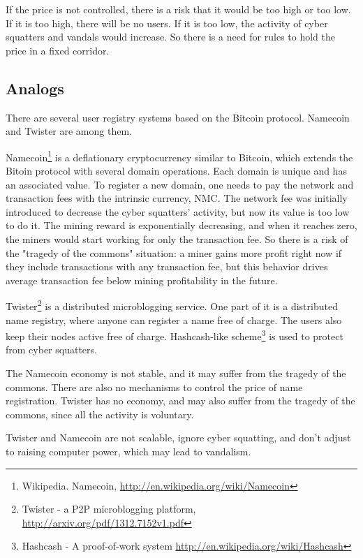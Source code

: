 \documentclass[12pt]{article}
\begin{document}
If the price is not controlled, there is a risk that it would be too high or too low. If it is too high, there will be no users. If it is too low, the activity of cyber squatters and vandals would increase. So there is a need for rules to hold the price in a fixed corridor.


\subsection{Analogs}

There are several user registry systems based on the Bitcoin protocol. Namecoin and Twister are among them.

Namecoin\footnote{Wikipedia. Namecoin, \href{http://en.wikipedia.org/wiki/Namecoin}{http://en.wikipedia.org/wiki/Namecoin}} is a deflationary cryptocurrency similar to Bitcoin, which extends the Bitoin protocol with several domain operations. Each domain is unique and has an associated value. To register a new domain, one needs to pay the network and transaction fees with the intrinsic currency, NMC. The network fee was initially introduced to decrease the cyber squatters' activity, but now its value is too low to do it. The mining reward is exponentially decreasing, and when it reaches zero, the miners would start working for only the transaction fee. So there is a risk of the "tragedy of the commons" situation: a miner gains more profit right now if they include transactions with any transaction fee, but this behavior drives average transaction fee below mining profitability in the future.

Twister\footnote{Twister - a P2P microblogging platform, \href{http://arxiv.org/pdf/1312.7152v1.pdf}{http://arxiv.org/pdf/1312.7152v1.pdf}} is a distributed microblogging service. One part of it is a distributed name registry, where anyone can register a name free of charge. The users also keep their nodes active free of charge. Hashcash-like scheme\footnote{Hashcash - A proof-of-work system \href{http://en.wikipedia.org/wiki/Hashcash}{http://en.wikipedia.org/wiki/Hashcash}} is used to protect from cyber squatters.

The Namecoin economy is not stable, and it may suffer from the tragedy of the commons. There are also no mechanisms to control the price of name registration. Twister has no economy, and may also suffer from the tragedy of the commons, since all the activity is voluntary.

Twister and Namecoin are not scalable, ignore cyber squatting, and don't adjust to raising computer power, which may lead to vandalism.
\end{document}
